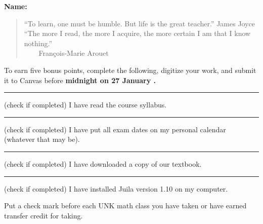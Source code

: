 \documentclass[12pt,fleqn,answers]{exam}
\begin{document}
\large
\vspace{0.1in}
\noindent{}
{\bf Name:}  \\
\noindent {}
\vspace{0.1in}

\begin{quote}
    “To learn, one must be humble. But life is the great teacher.”
   \hfill{\sc James Joyce} \\ 
   
    ``The more I read, the more I acquire, the more certain I am that 
    I know \mbox{nothing.}''  \\ $\phantom{xxx}$ \hfill{\sc François-Marie Arouet}
\end{quote}

\noindent  To earn five bonus points, complete the following, digitize your work, and submit it to Canvas before
\textbf{midnight on 27 January \the\year.}


\begin{questions} 

\question \rule{1cm}{0.15mm}  (check if completed) I have read the course syllabus.

\question  \rule{1cm}{0.15mm} (check if completed) I have put all exam dates on my personal calendar (whatever  that 
may be).

\question  \rule{1cm}{0.15mm} (check if completed) I have downloaded a copy of our textbook.

\question   \rule{1cm}{0.15mm} (check if completed) I have  installed Juila version 1.10 on my computer.

\question Put a check mark before each UNK math class you have taken or have earned transfer credit for taking.


\end{questions}
\end{document}
